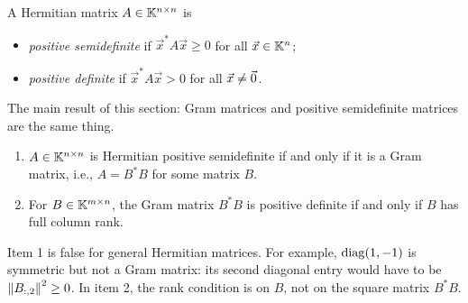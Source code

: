 \begin{definition}
  A Hermitian matrix $A \in \mathbb{K}^{n \times n}$ is
  \begin{itemize}
    \item \emph{positive semidefinite} if $\vec{x}^\ast A\vec{x} \ge 0$ for all $\vec{x} \in \mathbb{K}^n$;
    \item \emph{positive definite} if $\vec{x}^\ast A\vec{x} > 0$ for all $\vec{x} \ne \vec{0}$.
  \end{itemize}
\end{definition}

The main result of this section: Gram matrices and positive semidefinite matrices are the same thing.

\begin{theorem}
  \label{thm:gram}
  \begin{enumerate}
    \item $A \in \mathbb{K}^{n \times n}$ is Hermitian positive semidefinite if and only if it is a Gram matrix, i.e., $A = B^\ast B$ for some matrix $B$.
    \item For $B \in \mathbb{K}^{m \times n}$, the Gram matrix $B^\ast B$ is positive definite if and only if $B$ has full column rank.
  \end{enumerate}
\end{theorem}

Item 1 is false for general Hermitian matrices. For example, $\operatorname{diag}(1, -1)$ is symmetric but not a Gram matrix: its second diagonal entry would have to be $\left\lVert B_{:,2} \right\rVert^2 \ge 0$. In item 2, the rank condition is on $B$, not on the square matrix $B^\ast B$.

